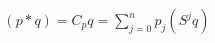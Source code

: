 \documentclass[preview]{standalone}
\begin{document}
\begin{align*}
(p * q) =  C_p  q = \sum_{j=0}^{n} p_j (S^j q)
\end{align*}
\end{document}
